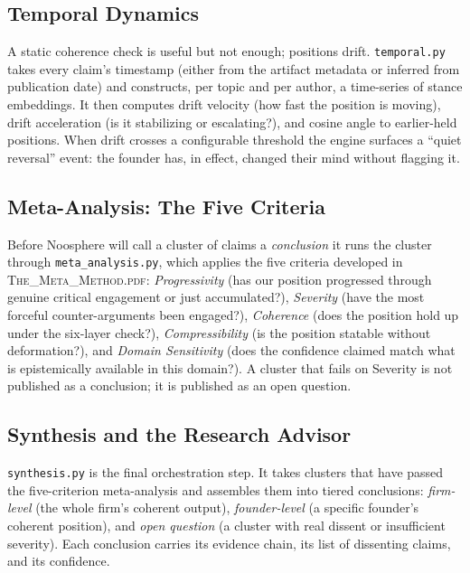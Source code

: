 \documentclass[11pt]{article}
\begin{document}
\subsection{Temporal Dynamics}

A static coherence check is useful but not enough; positions drift. \texttt{temporal.py} takes every claim's timestamp (either from the artifact metadata or inferred from publication date) and constructs, per topic and per author, a time-series of stance embeddings. It then computes drift velocity (how fast the position is moving), drift acceleration (is it stabilizing or escalating?), and cosine angle to earlier-held positions. When drift crosses a configurable threshold the engine surfaces a ``quiet reversal'' event: the founder has, in effect, changed their mind without flagging it.

\subsection{Meta-Analysis: The Five Criteria}

Before Noosphere will call a cluster of claims a \emph{conclusion} it runs the cluster through \texttt{meta\_analysis.py}, which applies the five criteria developed in \textsc{The\_Meta\_Method.pdf}: \textit{Progressivity} (has our position progressed through genuine critical engagement or just accumulated?), \textit{Severity} (have the most forceful counter-arguments been engaged?), \textit{Coherence} (does the position hold up under the six-layer check?), \textit{Compressibility} (is the position statable without deformation?), and \textit{Domain Sensitivity} (does the confidence claimed match what is epistemically available in this domain?). A cluster that fails on Severity is not published as a conclusion; it is published as an open question.

\subsection{Synthesis and the Research Advisor}

\texttt{synthesis.py} is the final orchestration step. It takes clusters that have passed the five-criterion meta-analysis and assembles them into tiered conclusions: \emph{firm-level} (the whole firm's coherent output), \emph{founder-level} (a specific founder's coherent position), and \emph{open question} (a cluster with real dissent or insufficient severity). Each conclusion carries its evidence chain, its list of dissenting claims, and its confidence.
\end{document}
